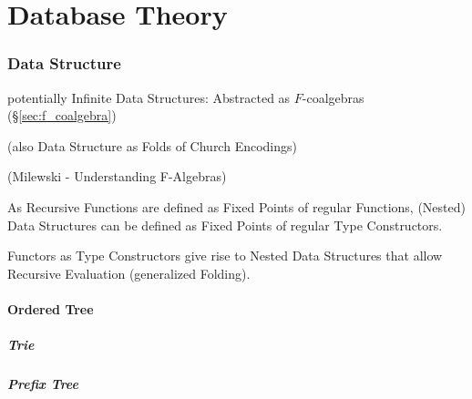 \part{Database Theory}\label{part:database_theory}

\section{Data Structure}\label{sec:data_structure}


potentially Infinite Data Structures: Abstracted as $F$-coalgebras
(\S\ref{sec:f_coalgebra})

(also Data Structure as Folds of Church Encodings)

(Milewski - Understanding F-Algebras)

As Recursive Functions are defined as Fixed Points of regular
Functions, (Nested) Data Structures can be defined as Fixed Points of
regular Type Constructors.

Functors as Type Constructors give rise to Nested Data Structures that
allow Recursive Evaluation (generalized Folding).



\subsection{Ordered Tree}\label{sec:ordered_tree}

\subsubsection{Trie}\label{sec:trie}

\subsubsection{Prefix Tree}\label{sec:prefix_tree}

